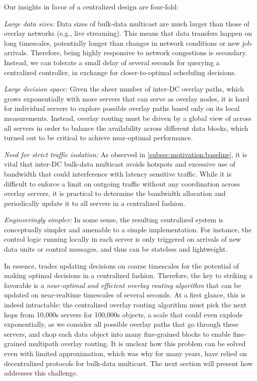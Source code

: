 Our insights in favor of a centralized design are four-fold:
\begin{packedenumerate}
\item {\em Large data sizes:}
Data sizes of bulk-data multicast are much larger
than those of overlay networks (e.g., live streaming).
This means that data transfers happen on long timescales,
potentially longer than changes in network conditions or
new job arrivals.
Therefore, being highly responsive to network congestions
is secondary.
Instead, we can tolerate a small delay of several seconds for
querying a centralized controller,
in exchange for closer-to-optimal scheduling decisions.
\item {\em Large decision space:}
Given the sheer number of inter-DC overlay paths,
which grows exponentially with more servers that can
serve as overlay nodes,
it is hard for individual servers to explore possible overlay
paths based only on its local measurements.
Instead, overlay routing must be driven by a global
view of across all servers in order to
balance the availability across different data blocks, which
turned out to be critical to achieve near-optimal performance.
\item {\em Need for strict traffic isolation:}
As observed in \Section\ref{subsec:motivation:baseline}, it is vital that inter-DC
bulk-data multicast avoids hotspots and excessive use of
bandwidth that could interference with latency sensitive traffic.
While it is difficult to enforce a limit on outgoing traffic
without any coordination across overlay servers, it is practical
to determine the bandwidth allocation and periodically update it
to all servers in a centralized fashion.
\item {\em Engineeringly simpler:}
In some sense, the resulting centralized system is conceptually
simpler and amenable to a simple implementation.
For instance, the control logic running locally in each server
is only triggered on arrivals of new data units or control messages,
and thus can be stateless and lightweight.

\end{packedenumerate}

In essence, \name trades updating decisions on coarse timescales
for the potential of making optimal decisions in a centralized
fashion.
Therefore, the key to striking a favorable is a
{\em near-optimal and efficient overlay routing
algorithm} that can be updated on near-realtime timescales of
several seconds.
At a first glance, this is indeed intractable:
the centralized overlay routing algorithm must pick the next hops
from 10,000s servers for 100,000s objects, a scale that could
even explode exponentially, as we consider all possible
overlay paths that go through these servers, and chop each data
object into many fine-grained blocks to enable fine-grained
multipath overlay routing.
It is unclear how this problem can be solved even with
limited approximation, which was why for many years, \company have
relied on decentralized protocols for bulk-data multicast.
The next section  will present how \name addresses this
challenge.

